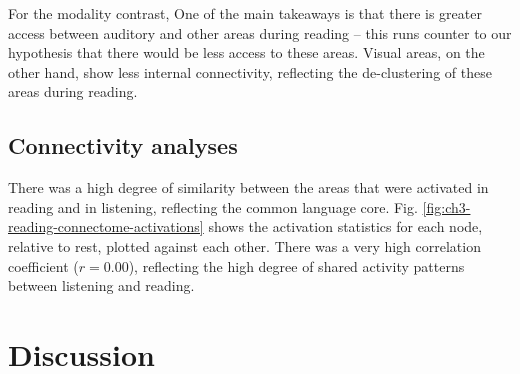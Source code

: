 For the modality contrast, One of the main takeaways is that there is greater access between auditory and other areas during reading -- this runs counter to our hypothesis that there would be less access to these areas. Visual areas, on the other hand, show less internal connectivity, reflecting the de-clustering of these areas during reading. 

\subsection{Connectivity analyses}
There was a high degree of similarity between the areas that were activated in reading and in listening, reflecting the common language core. Fig. \ref{fig:ch3-reading-connectome-activations} shows the activation statistics for each node, relative to rest, plotted against each other. There was a very high correlation coefficient ($r = 0.00$), reflecting the high degree of shared activity patterns between listening and reading.


\section{Discussion}


